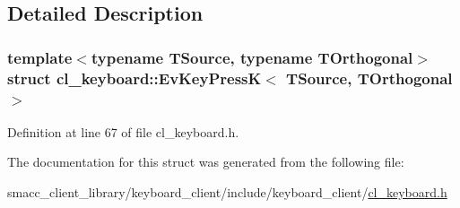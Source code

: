 \subsection{Detailed Description}
\subsubsection*{template$<$typename T\+Source, typename T\+Orthogonal$>$\newline
struct cl\+\_\+keyboard\+::\+Ev\+Key\+Press\+K$<$ T\+Source, T\+Orthogonal $>$}



Definition at line 67 of file cl\+\_\+keyboard.\+h.



The documentation for this struct was generated from the following file\+:\begin{DoxyCompactItemize}
\item 
smacc\+\_\+client\+\_\+library/keyboard\+\_\+client/include/keyboard\+\_\+client/\hyperlink{cl__keyboard_8h}{cl\+\_\+keyboard.\+h}\end{DoxyCompactItemize}

